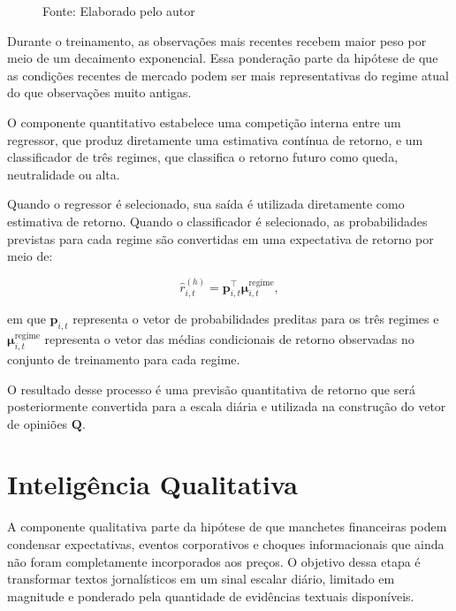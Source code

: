 \begin{figure}[htbp]
{
    }

    \par\smallskip
    Fonte: Elaborado pelo autor
\end{figure}

Durante o treinamento, as observações mais recentes recebem maior peso por meio de um decaimento exponencial. Essa ponderação parte da hipótese de que as condições recentes de mercado podem ser mais representativas do regime atual do que observações muito antigas.

O componente quantitativo estabelece uma competição interna entre um regressor, que produz diretamente uma estimativa contínua de retorno, e um classificador de três regimes, que classifica o retorno futuro como queda, neutralidade ou alta.

Quando o regressor é selecionado, sua saída é utilizada diretamente como estimativa de retorno. Quando o classificador é selecionado, as probabilidades previstas para cada regime são convertidas em uma expectativa de retorno por meio de:

\begin{equation}
    \widehat{r}_{i,t}^{(h)}
    =
    \boldsymbol{p}_{i,t}^{\top}
    \boldsymbol{\mu}_{i,t}^{\mathrm{regime}},
    \label{eq:expected_return_class}
\end{equation}

em que $\boldsymbol{p}_{i,t}$ representa o vetor de probabilidades preditas para os três regimes e $\boldsymbol{\mu}_{i,t}^{\mathrm{regime}}$ representa o vetor das médias condicionais de retorno observadas no conjunto de treinamento para cada regime.

O resultado desse processo é uma previsão quantitativa de retorno que será posteriormente convertida para a escala diária e utilizada na construção do vetor de opiniões $\boldsymbol{Q}$.

\section{Inteligência Qualitativa}
\label{sec:inteligencia_qualitativa}

A componente qualitativa parte da hipótese de que manchetes financeiras podem condensar expectativas, eventos corporativos e choques informacionais que ainda não foram completamente incorporados aos preços. O objetivo dessa etapa é transformar textos jornalísticos em um sinal escalar diário, limitado em magnitude e ponderado pela quantidade de evidências textuais disponíveis.

